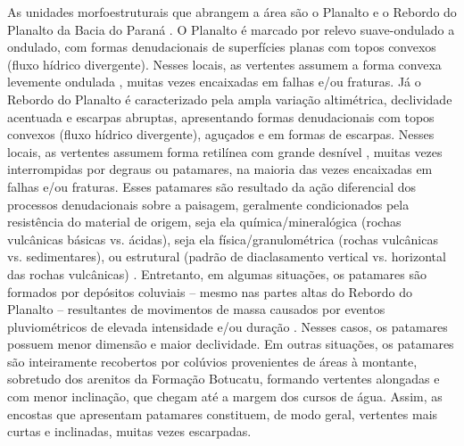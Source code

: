 As unidades morfoestruturais que abrangem a área são o Planalto e o Rebordo do Planalto da Bacia do Paraná 
\cite{NascimentoEtAl2010}. O Planalto é marcado por relevo suave-ondulado a ondulado, com formas denudacionais 
de superfícies planas com topos convexos (fluxo hídrico divergente). Nesses locais, as vertentes assumem a 
forma convexa levemente ondulada \cite{NascimentoEtAl2010}, muitas vezes encaixadas em falhas e/ou fraturas. 
Já o Rebordo do Planalto é caracterizado pela ampla variação altimétrica, declividade acentuada e escarpas 
abruptas, apresentando formas denudacionais com topos convexos (fluxo hídrico divergente), aguçados e em 
formas de escarpas. Nesses locais, as vertentes assumem forma retilínea com grande desnível 
\cite{NascimentoEtAl2010}, muitas vezes interrompidas por degraus ou patamares, na maioria das vezes encaixadas 
em falhas e/ou fraturas. Esses patamares são resultado da ação diferencial dos processos denudacionais sobre a 
paisagem, geralmente condicionados pela resistência do material de origem, seja ela química/mineralógica 
(rochas vulcânicas básicas vs. ácidas), seja ela física/granulométrica (rochas vulcânicas vs. sedimentares), ou 
estrutural (padrão de diaclasamento vertical vs. horizontal das rochas vulcânicas) \cite{Holtz2003, Pedron2007, 
StreckEtAl2008}. Entretanto, em algumas situações, os patamares são formados por depósitos coluviais -- mesmo 
nas partes altas do Rebordo do Planalto -- resultantes de movimentos de massa causados por eventos 
pluviométricos de elevada intensidade e/ou duração \cite{PinheiroEtAl2004, PaisaniEtAl2010}. Nesses casos, os 
patamares possuem menor dimensão e maior declividade. Em outras situações, os patamares são inteiramente 
recobertos por colúvios provenientes de áreas à montante, sobretudo dos arenitos da Formação Botucatu, formando 
vertentes alongadas e com menor inclinação, que chegam até a margem dos cursos de água. Assim, as encostas que 
apresentam patamares constituem, de modo geral, vertentes mais curtas e inclinadas, muitas vezes escarpadas.


